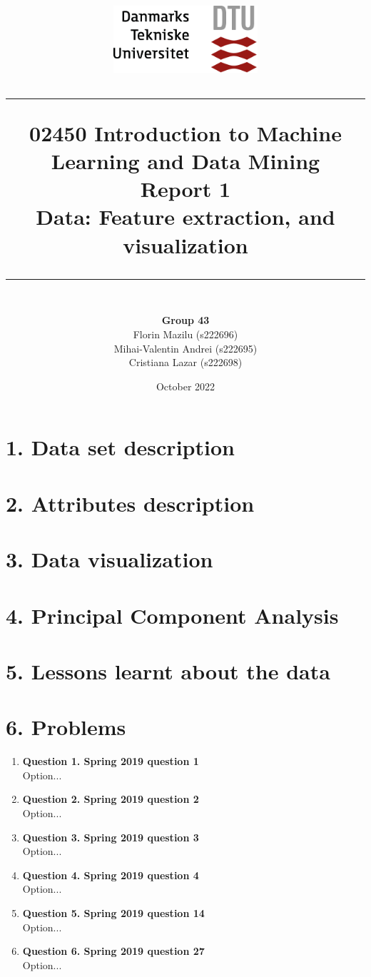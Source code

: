 \documentclass[12pt]{article}
\title{
    
    {\includegraphics[width=0.4\textwidth]{dtu_logo.png}}\\
    \vspace{1.5cm}
    \hrule 
    \vspace{1cm}
    \large 02450 Introduction to Machine Learning and Data Mining \\ 
    \vspace{1cm}
    \textbf{Report 1} \\
    \text Data: Feature extraction, and visualization
    \vspace{1cm} 
    \hrule
    \vspace{9cm}
}
\author{\\\textbf{Group 43} \\ Florin Mazilu (s222696) \\ Mihai-Valentin Andrei (s222695)\\Cristiana Lazar (s222698)}
\date{ October 2022}
\begin{document}
\maketitle
\clearpage

\section*{1. Data set description}


\section*{2. Attributes description }

\section*{3. Data visualization}

\section*{4. Principal Component Analysis}

\section*{5. Lessons learnt about the data}

\section*{6. Problems}
\begin{enumerate}
  \item \textbf{Question 1. Spring 2019 question 1} \\
  Option...
  \item \textbf{Question 2. Spring 2019 question 2} \\
  Option...
  \item \textbf{Question 3. Spring 2019 question 3} \\
  Option...
  \item \textbf{Question 4. Spring 2019 question 4} \\
  Option...
  \item \textbf{Question 5. Spring 2019 question 14} \\
  Option...
  \item \textbf{Question 6. Spring 2019 question 27} \\
  Option...
\end{enumerate}


\end{document}
